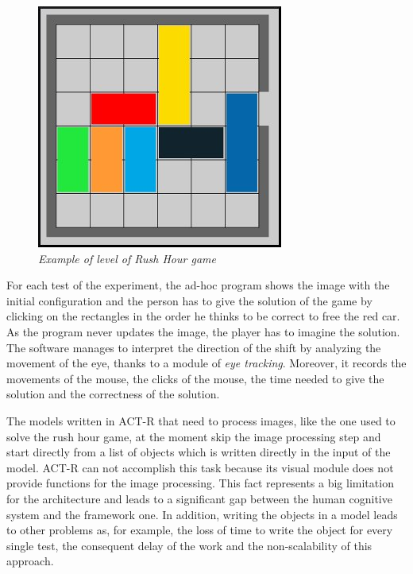 	\begin{figure}[!h]
	  \begin{center} 
	    \includegraphics[scale=0.6]{images/ch_03/originale.jpg}	
	  \end{center} 
	  \caption{\textit{Example of level of Rush Hour game}}
	  \label{fig:RushHourHuman}	
  	\end{figure}
	
	For each test of the experiment, the ad-hoc program shows the image with the initial configuration and the person has to give the solution of the game by clicking on the rectangles in the order he thinks to be correct to free the red car. As the program never updates the image, the player has to imagine the solution. The software manages to interpret the direction of the shift by analyzing the movement of the eye, thanks to a module of \emph{eye tracking}. Moreover, it records the movements of the mouse, the clicks of the mouse, the time needed to give the solution and the correctness of the solution. 

	The models written in ACT-R that need to process images, like the one used to solve the rush hour game, at the moment skip the image processing step and start directly from a list of objects which is written directly in the input of the model. ACT-R can not accomplish this task because its visual module does not provide functions for the image processing.
	This fact represents a big limitation for the architecture and leads to a significant gap between the human cognitive system and the framework one. In addition, writing the objects in a model leads to other problems as, for example, the loss of time to write the object for every single test, the consequent delay of the work and the non-scalability of this approach.
	
